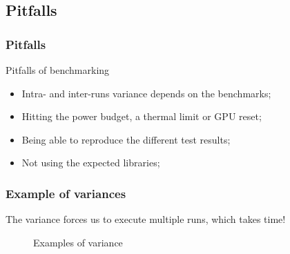 \documentclass[11pt,english,compress]{beamer}
\begin{document}
\subsection{Pitfalls}
\begin{frame}
	\frametitle{Pitfalls}
	
	\begin{block}{Pitfalls of benchmarking}
		\begin{itemize}
			\item Intra- and inter-runs variance depends on the benchmarks;\pause
			\item Hitting the power budget, a thermal limit or GPU reset;\pause
			\item Being able to reproduce the different test results;\pause
			\item Not using the expected libraries;
		\end{itemize}
	\end{block}
\end{frame}

\begin{frame}
	\frametitle{Example of variances}
	
	\begin{block}{}
		The variance forces us to execute multiple runs, which takes time!
	\end{block}
	
	\pause
	
	\begin{figure}%
		\centering
		\qquad
		\pause
		\caption{Examples of variance}%
	\end{figure}
\end{frame}
\end{document}
